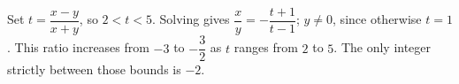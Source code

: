 Set $t=\dfrac{x-y}{x+y}$, so $2<t<5$. Solving gives $\dfrac{x}{y}=-\dfrac{t+1}{t-1}$; $y\ne0$, since otherwise $t=1$. This ratio increases from $-3$ to $-\dfrac{3}{2}$ as $t$ ranges from $2$ to $5$. The only integer strictly between those bounds is $\boxed{-2}$.
